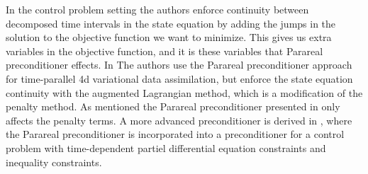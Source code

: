 In the control problem setting the authors enforce continuity between decomposed time intervals in the state equation by adding the jumps in the solution to the objective function we want to minimize. This gives us extra variables in the objective function, and it is these variables that Parareal preconditioner effects. In \cite{rao2016time} The authors use the Parareal preconditioner approach for time-parallel 4d variational data assimilation, but enforce the state equation continuity with the augmented Lagrangian method, which is a modification of the penalty method\cite{nocedal2006numerical}. As mentioned the Parareal preconditioner presented in \cite{maday2002parareal} only affects the penalty terms. A more advanced preconditioner is derived in \cite{ulbrich2015preconditioners}, where the Parareal preconditioner is incorporated into a preconditioner for a control problem with time-dependent partiel differential equation constraints and inequality constraints.